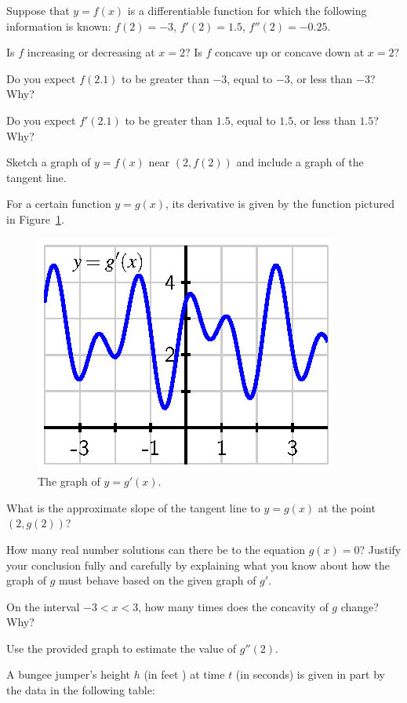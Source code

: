 \begin{exercises} 
\item Suppose that $y = f(x)$ is a differentiable function for which the following information is known:  $f(2) = -3$, $f'(2) = 1.5$, $f''(2) = -0.25$.
\ba
	\item Is $f$ increasing or decreasing at $x = 2$?  Is $f$ concave up or concave down at $x = 2$?
	\item Do you expect $f(2.1)$ to be greater than $-3$, equal to $-3$, or less than $-3$?  Why?
	\item Do you expect $f'(2.1)$ to be greater than $1.5$, equal to $1.5$, or less than $1.5$?  Why?
	\item Sketch a graph of $y = f(x)$ near $(2,f(2))$ and include a graph of the tangent line.  
\ea
\begin{exerciseSolution}
\end{exerciseSolution}
\item For a certain function $y = g(x)$, its derivative is given by the function pictured in Figure~\ref{F:1.6.Ez2}.
\begin{figure}[ht]
\begin{center}
\includegraphics{figures/1_6_Ez2.eps}
\caption{The graph of $y = g'(x)$.} \label{F:1.6.Ez2}
\end{center}
\end{figure}
\ba
	\item What is the approximate slope of the tangent line to $y = g(x)$ at the point $(2,g(2))$?
	\item How many real number solutions can there be to the equation $g(x) = 0$?  Justify your conclusion fully and carefully by explaining what you know about how the graph of $g$ must behave based on the given graph of $g'$.
	\item On the interval $-3 < x < 3$, how many times does the concavity of $g$ change?  Why?
	\item Use the provided graph to estimate the value of $g''(2)$.
\ea
\item A bungee jumper's height $h$ (in feet ) at time $t$ (in seconds) is given in part by the data in the following table:


\end{exercises}
